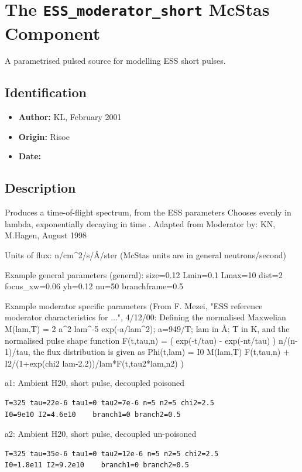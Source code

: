 \section{The \texttt{ESS\_moderator\_short} McStas Component}
A parametrised pulsed source for modelling ESS short pulses.

\subsection*{Identification}
\begin{itemize}
  \item \textbf{Author:} KL, February 2001
  \item \textbf{Origin:} Risoe
  \item \textbf{Date:} 
\end{itemize}

\subsection*{Description}
Produces a time-of-flight spectrum, from the ESS parameters Chooses evenly in lambda, exponentially decaying in time . Adapted from Moderator by: KN, M.Hagen, August 1998

Units of flux: n/cm\textasciicircum{}2/s/\AA{}/ster (McStas units are in general neutrons/second)

Example general parameters (general): size=0.12 Lmin=0.1 Lmax=10 dist=2 focus\_xw=0.06 yh=0.12 nu=50 branchframe=0.5

Example moderator specific parameters (From F. Mezei, "ESS reference moderator characteristics for ...", 4/12/00: Defining the normalised Maxwelian M(lam,T) = 2 a\textasciicircum{}2 lam\textasciicircum{}-5 exp(-a/lam\textasciicircum{}2); a=949/T; lam in \AA{}; T in K, and the normalised pulse shape function F(t,tau,n) = ( exp(-t/tau) - exp(-nt/tau) ) n/(n-1)/tau, the flux distribution is given as Phi(t,lam) = I0 M(lam,T) F(t,tau,n) + I2/(1+exp(chi2 lam-2.2))/lam*F(t,tau2*lam,n2) )

a1: Ambient H20, short pulse, decoupled poisoned

\begin{verbatim}
T=325 tau=22e-6 tau1=0 tau2=7e-6 n=5 n2=5 chi2=2.5
I0=9e10 I2=4.6e10    branch1=0 branch2=0.5
\end{verbatim}

a2: Ambient H20, short pulse, decoupled un-poisoned

\begin{verbatim}
T=325 tau=35e-6 tau1=0 tau2=12e-6 n=5 n2=5 chi2=2.5
I0=1.8e11 I2=9.2e10    branch1=0 branch2=0.5
\end{verbatim}

